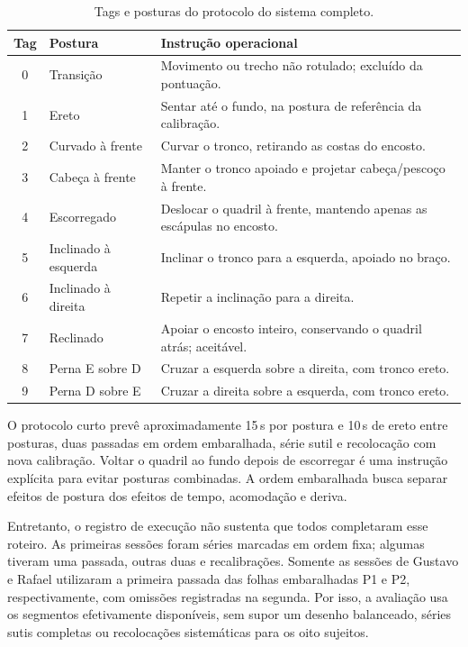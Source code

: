 \begin{table}[H]
  \centering
  \begin{singlespace}
  \caption{Tags e posturas do protocolo do sistema completo.}
  \label{tab:met-posturas}
  \small
  \begin{tabularx}{\linewidth}{@{}c l X@{}}
    \toprule
    Tag & Postura & Instrução operacional \\
    \midrule
    0 & Transição & Movimento ou trecho não rotulado; excluído da pontuação. \\
    1 & Ereto & Sentar até o fundo, na postura de referência da calibração. \\
    2 & Curvado à frente & Curvar o tronco, retirando as costas do encosto. \\
    3 & Cabeça à frente & Manter o tronco apoiado e projetar cabeça/pescoço à frente. \\
    4 & Escorregado & Deslocar o quadril à frente, mantendo apenas as escápulas no encosto. \\
    5 & Inclinado à esquerda & Inclinar o tronco para a esquerda, apoiado no braço. \\
    6 & Inclinado à direita & Repetir a inclinação para a direita. \\
    7 & Reclinado & Apoiar o encosto inteiro, conservando o quadril atrás; aceitável. \\
    8 & Perna E sobre D & Cruzar a esquerda sobre a direita, com tronco ereto. \\
    9 & Perna D sobre E & Cruzar a direita sobre a esquerda, com tronco ereto. \\
    \bottomrule
  \end{tabularx}
  \end{singlespace}
\end{table}

O protocolo curto prevê aproximadamente 15\,s por postura e
10\,s de ereto entre posturas, duas passadas em ordem embaralhada,
série sutil e recolocação com nova calibração. Voltar o quadril ao
fundo depois de escorregar é uma instrução explícita para evitar
posturas combinadas. A ordem embaralhada busca separar efeitos de
postura dos efeitos de tempo, acomodação e deriva.

Entretanto, o registro de execução não sustenta que todos completaram
esse roteiro. As primeiras sessões foram séries marcadas em ordem
fixa; algumas tiveram uma passada, outras duas e recalibrações.
Somente as sessões de Gustavo e Rafael utilizaram a primeira passada
das folhas embaralhadas P1 e P2, respectivamente, com omissões
registradas na segunda. Por isso, a avaliação usa os segmentos
efetivamente disponíveis, sem supor um desenho balanceado, séries
sutis completas ou recolocações sistemáticas para os oito sujeitos.

